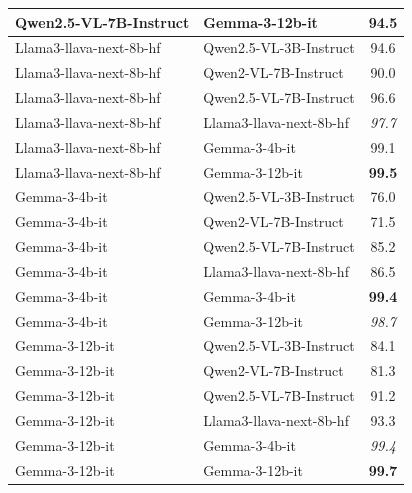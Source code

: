 \documentclass[11pt]{article}
\begin{document}
\begin{table}[htbp]
{\begin{tabular}{l l c}
Qwen2.5-VL-7B-Instruct & Gemma-3-12b-it & 94.5 \\
\midrule
Llama3-llava-next-8b-hf & Qwen2.5-VL-3B-Instruct & 94.6 \\
Llama3-llava-next-8b-hf & Qwen2-VL-7B-Instruct & 90.0 \\
Llama3-llava-next-8b-hf & Qwen2.5-VL-7B-Instruct & 96.6 \\
Llama3-llava-next-8b-hf & Llama3-llava-next-8b-hf & \textit{97.7} \\
Llama3-llava-next-8b-hf & Gemma-3-4b-it & 99.1 \\
Llama3-llava-next-8b-hf & Gemma-3-12b-it & \textbf{99.5} \\
\midrule
Gemma-3-4b-it & Qwen2.5-VL-3B-Instruct & 76.0 \\
Gemma-3-4b-it & Qwen2-VL-7B-Instruct & 71.5 \\
Gemma-3-4b-it & Qwen2.5-VL-7B-Instruct & 85.2 \\
Gemma-3-4b-it & Llama3-llava-next-8b-hf & 86.5 \\
Gemma-3-4b-it & Gemma-3-4b-it & \textbf{99.4} \\
Gemma-3-4b-it & Gemma-3-12b-it & \textit{98.7} \\
\midrule
Gemma-3-12b-it & Qwen2.5-VL-3B-Instruct & 84.1 \\
Gemma-3-12b-it & Qwen2-VL-7B-Instruct & 81.3 \\
Gemma-3-12b-it & Qwen2.5-VL-7B-Instruct & 91.2 \\
Gemma-3-12b-it & Llama3-llava-next-8b-hf & 93.3 \\
Gemma-3-12b-it & Gemma-3-4b-it & \textit{99.4} \\
Gemma-3-12b-it & Gemma-3-12b-it & \textbf{99.7} \\
\bottomrule[1pt]
\end{tabular}
}
\end{table}
\end{document}
